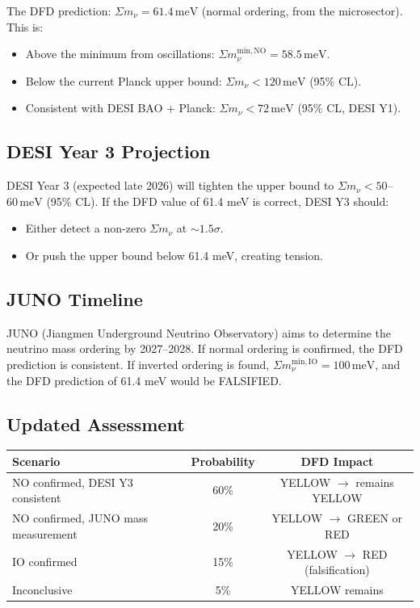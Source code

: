 \documentclass[11pt,a4paper]{article}
\begin{document}
The DFD prediction: $\Sigma m_\nu = 61.4\,\mathrm{meV}$ (normal ordering, from the microsector). This is:
\begin{itemize}
\item Above the minimum from oscillations: $\Sigma m_\nu^{\mathrm{min,NO}} = 58.5\,\mathrm{meV}$.
\item Below the current Planck upper bound: $\Sigma m_\nu < 120\,\mathrm{meV}$ (95\% CL).
\item Consistent with DESI BAO + Planck: $\Sigma m_\nu < 72\,\mathrm{meV}$ (95\% CL, DESI Y1).
\end{itemize}

\subsection{DESI Year 3 Projection}

DESI Year 3 (expected late 2026) will tighten the upper bound to $\Sigma m_\nu < 50$--$60\,\mathrm{meV}$ (95\% CL). If the DFD value of 61.4 meV is correct, DESI Y3 should:
\begin{itemize}
\item Either detect a non-zero $\Sigma m_\nu$ at $\sim 1.5\sigma$.
\item Or push the upper bound below 61.4 meV, creating tension.
\end{itemize}

\subsection{JUNO Timeline}

JUNO (Jiangmen Underground Neutrino Observatory) aims to determine the neutrino mass ordering by 2027--2028. If normal ordering is confirmed, the DFD prediction is consistent. If inverted ordering is found, $\Sigma m_\nu^{\mathrm{min,IO}} = 100\,\mathrm{meV}$, and the DFD prediction of 61.4 meV would be FALSIFIED.

\subsection{Updated Assessment}

\begin{center}
\begin{tabular}{lcc}
\toprule
\textbf{Scenario} & \textbf{Probability} & \textbf{DFD Impact} \\
\midrule
NO confirmed, DESI Y3 consistent & 60\% & YELLOW $\to$ remains YELLOW \\
NO confirmed, JUNO mass measurement & 20\% & YELLOW $\to$ GREEN or RED \\
IO confirmed & 15\% & YELLOW $\to$ RED (falsification) \\
Inconclusive & 5\% & YELLOW remains \\
\bottomrule
\end{tabular}
\end{center}
\end{document}
